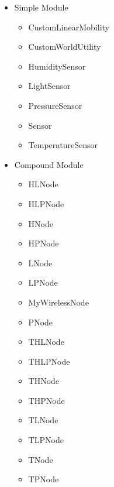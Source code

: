 \begin{itemize}{\label{enum:Netzwerk}}
\item Simple Module
\begin{multicols}{2}
\begin{itemize}
\item CustomLinearMobility
\item CustomWorldUtility  
\item HumiditySensor
\item LightSensor
\item PressureSensor
\item Sensor
\item TemperatureSensor 
\end{itemize}
\end{multicols}
\item Compound Module
\begin{multicols}{2}
\begin{itemize}
\item HLNode
\item HLPNode
\item HNode
\item HPNode
\item LNode
\item LPNode
\item MyWirelessNode
\item PNode
\item THLNode
\item THLPNode
\item THNode
\item THPNode
\item TLNode
\item TLPNode
\item TNode
\item TPNode 
\end{itemize}
\end{multicols}
\end{itemize}

